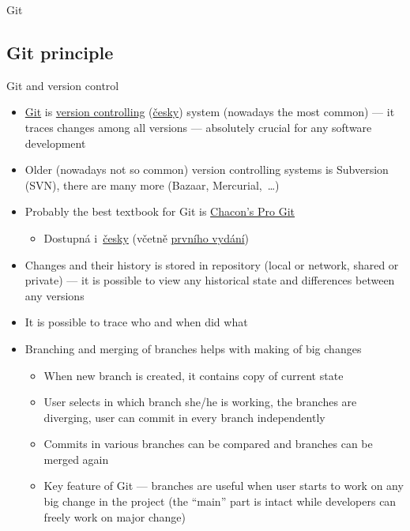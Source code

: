 \documentclass[compress, ucs, xelatex, 11pt, xcolor=svgnames, aspectratio=169,
	hyperref={
		bookmarks=true,
		unicode=true,
		colorlinks=true,
		pdftitle={Linux, command line and MetaCentrum},
		plainpages=false,
		pdfauthor={Vojtech Zeisek},
		pdfsubject={Course about use of Linux command line, writing shell scripts and using MetaCentrum of CESNET},
		pdfcreator={XeLaTeX},
		pdfkeywords={Linux, GNU, BASH, shell, command line, MetaCentrum},
		linkcolor=DarkRed, %
		anchorcolor=DarkBlue, %
		citecolor=Indigo, %
		filecolor=NavyBlue, %
		menucolor=DarkMagenta, %
		urlcolor=DarkBlue, %
		pdftex},
	url={hyphens, lowtilde} %
	]{beamer}
\begin{document}
\begin{frame}{Git}
	\tableofcontents[currentsection, sectionstyle=show/hide, hideothersubsections]
\end{frame}

\subsection{Git principle}

\begin{frame}[allowframebreaks]{Git and version control}
	\begin{itemize}
		\item \href{https://git-scm.com/}{Git} is \href{https://en.wikipedia.org/wiki/Version_control}{version controlling} (\href{https://cs.wikipedia.org/wiki/Verzov\%C3\%A1n\%C3\%AD}{česky}) system (nowadays the most common) --- it traces changes among all versions --- absolutely crucial for any software development
		\item Older (nowadays not so common) version controlling systems is Subversion (SVN), there are many more (Bazaar, Mercurial,~\ldots)
		\item Probably the best textbook for Git is \href{https://git-scm.com/book/en/v2}{Chacon's Pro Git}
		\begin{itemize}
			\item Dostupná i~\href{https://git-scm.com/book/cs/v2}{česky} (včetně \href{https://knihy.nic.cz/\#ProGit}{prvního vydání})
		\end{itemize}
		\item Changes and their history is stored in repository (local or network, shared or private) --- it is possible to view any historical state and differences between any versions
		\item It is possible to trace who and when did what
		\item Branching and merging of branches helps with making of big changes
		\begin{itemize}
			\item When new branch is created, it contains copy of current state
			\item User selects in which branch she/he is working, the branches are diverging, user can commit in every branch independently
			\item Commits in various branches can be compared and branches can be merged again
			\item Key feature of Git --- branches are useful when user starts to work on any big change in the project (the \enquote{main} part is intact while developers can freely work on major change)

\end{itemize}
\end{itemize}
\end{frame}
\end{document}
